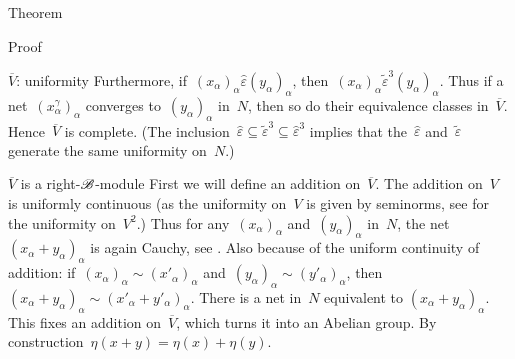 \documentclass[b]{subfiles}
\begin{document}
\begin{parsec}
\begin{point}{Theorem}
\begin{point}{Proof}
\begin{point}{$\overline{V}$: uniformity}
Furthermore, if~$(x_\alpha)_\alpha \mathrel{\hat\varepsilon}
(y_\alpha)_\alpha $,
then~$(x_\alpha)_\alpha \mathrel{\tilde\varepsilon^3} (y_\alpha)_\alpha$.
Thus if a net~$(x^\gamma_\alpha)_\alpha$
converges to~$(y_\alpha)_\alpha$ in~$N$,
then so do their equivalence classes in~$\overline{V}$.
Hence~$\overline{V}$ is complete.
(The inclusion~$\hat\varepsilon \subseteq \tilde\varepsilon^3 \subseteq
        \hat\varepsilon^3$
        implies that the~$\hat\varepsilon$ and~$\tilde\varepsilon$
        generate the same uniformity on~$N$.)
\end{point}
\begin{point}{$\overline{V}$ is a right-$\mathscr{B}$-module}%
    First we will define an addition on~$\overline{V}$.
    The addition on~$V$ is uniformly continuous
    (as the uniformity on~$V$ is given by seminorms,
    see  for the uniformity on~$V^2$.)
    Thus for any~$(x_\alpha)_\alpha$
    and~$(y_\alpha)_\alpha$ in~$N$,
    the net~$(x_\alpha+y_\alpha)_\alpha$ is again Cauchy,
        see .
    Also because of the uniform continuity of addition:
    if~$(x_\alpha)_\alpha \sim (x'_\alpha)_\alpha$
    and~$(y_\alpha)_\alpha \sim (y'_\alpha)_\alpha$,
    then~$(x_\alpha+y_\alpha)_\alpha \sim
            (x'_\alpha+y'_\alpha)_\alpha$.
    There is a net in~$N$ equivalent to $(x_\alpha+y_\alpha)_\alpha$.
    This fixes an addition on~$\overline{V}$,
        which turns it into an Abelian group.
        By construction~$\eta(x+y) = \eta(x)+\eta(y)$.


\end{point}
\end{point}
\end{point}
\end{parsec}
\end{document}
